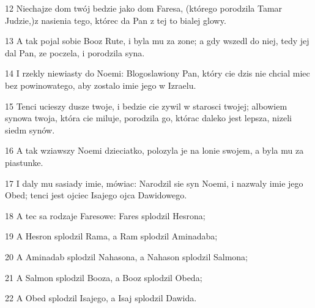 \par 12 Niechajze dom twój bedzie jako dom Faresa, (którego porodzila Tamar Judzie,)z nasienia tego, którec da Pan z tej to bialej glowy.
\par 13 A tak pojal sobie Booz Rute, i byla mu za zone; a gdy wszedl do niej, tedy jej dal Pan, ze poczela, i porodzila syna.
\par 14 I rzekly niewiasty do Noemi: Blogoslawiony Pan, który cie dzis nie chcial miec bez powinowatego, aby zostalo imie jego w Izraelu.
\par 15 Tenci ucieszy dusze twoje, i bedzie cie zywil w starosci twojej; albowiem synowa twoja, która cie miluje, porodzila go, którac daleko jest lepsza, nizeli siedm synów.
\par 16 A tak wziawszy Noemi dzieciatko, polozyla je na lonie swojem, a byla mu za piastunke.
\par 17 I daly mu sasiady imie, mówiac: Narodzil sie syn Noemi, i nazwaly imie jego Obed; tenci jest ojciec Isajego ojca Dawidowego.
\par 18 A tec sa rodzaje Faresowe: Fares splodzil Hesrona;
\par 19 A Hesron splodzil Rama, a Ram splodzil Aminadaba;
\par 20 A Aminadab splodzil Nahasona, a Nahason splodzil Salmona;
\par 21 A Salmon splodzil Booza, a Booz splodzil Obeda;
\par 22 A Obed splodzil Isajego, a Isaj splodzil Dawida.


